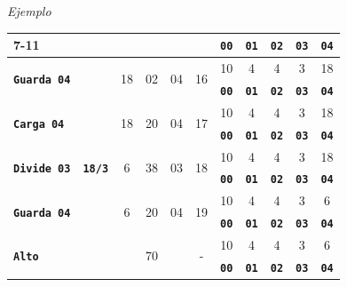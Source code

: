 \documentclass[11pt,spanish]{article}
\providecommand{\tabularnewline}{\\}
\begin{document}
\begin{bclogo}[noborder=true, couleurBarre=celestialblue,arrondi =0.1, couleur =anti-flashwhite, logo=\bccrayon, marge =10]{\textit{Ejemplo}}
\begin{center}
\begin{longtable}[c]{|l|c|c|c|c|c|c|c|c|c|c|}
\cline{7-11} \cline{8-11} \cline{9-11} \cline{10-11} \cline{11-11} 
 &  &  &  &  &  & \texttt{\textbf{00}} & \texttt{\textbf{01}} & \texttt{\textbf{02}} & \texttt{\textbf{03}} & \texttt{\textbf{04}}\tabularnewline
\hline 
\multirow{2}{*}{\texttt{\textbf{Guarda 04}}} & \multirow{2}{*}{} & \multirow{2}{*}{18} & \multirow{2}{*}{02} & \multirow{2}{*}{04} & \multirow{2}{*}{16} & 10 & 4 & 4 & 3 & 18\tabularnewline
\cline{7-11} \cline{8-11} \cline{9-11} \cline{10-11} \cline{11-11} 
 &  &  &  &  &  & \texttt{\textbf{00}} & \texttt{\textbf{01}} & \texttt{\textbf{02}} & \texttt{\textbf{03}} & \texttt{\textbf{04}}\tabularnewline
\hline 
\multirow{2}{*}{\texttt{\textbf{Carga 04}}} & \multirow{2}{*}{} & \multirow{2}{*}{18} & \multirow{2}{*}{20} & \multirow{2}{*}{04} & \multirow{2}{*}{17} & 10 & 4 & 4 & 3 & 18\tabularnewline
\cline{7-11} \cline{8-11} \cline{9-11} \cline{10-11} \cline{11-11} 
 &  &  &  &  &  & \texttt{\textbf{00}} & \texttt{\textbf{01}} & \texttt{\textbf{02}} & \texttt{\textbf{03}} & \texttt{\textbf{04}}\tabularnewline
\hline 
\multirow{2}{*}{\texttt{\textbf{Divide 03}}} & \multirow{2}{*}{\texttt{\textbf{18/3}}} & \multirow{2}{*}{6} & \multirow{2}{*}{38} & \multirow{2}{*}{03} & \multirow{2}{*}{18} & 10 & 4 & 4 & 3 & 18\tabularnewline
\cline{7-11} \cline{8-11} \cline{9-11} \cline{10-11} \cline{11-11} 
 &  &  &  &  &  & \texttt{\textbf{00}} & \texttt{\textbf{01}} & \texttt{\textbf{02}} & \texttt{\textbf{03}} & \texttt{\textbf{04}}\tabularnewline
\hline 
\multirow{2}{*}{\texttt{\textbf{Guarda 04}}} & \multirow{2}{*}{} & \multirow{2}{*}{6} & \multirow{2}{*}{20} & \multirow{2}{*}{04} & \multirow{2}{*}{19} & 10 & 4 & 4 & 3 & 6\tabularnewline
\cline{7-11} \cline{8-11} \cline{9-11} \cline{10-11} \cline{11-11} 
 &  &  &  &  &  & \texttt{\textbf{00}} & \texttt{\textbf{01}} & \texttt{\textbf{02}} & \texttt{\textbf{03}} & \texttt{\textbf{04}}\tabularnewline
\hline 
\multirow{2}{*}{\texttt{\textbf{Alto}}} & \multirow{2}{*}{} & \multirow{2}{*}{} & \multirow{2}{*}{70} & \multirow{2}{*}{} & \multirow{2}{*}{-} & 10 & 4 & 4 & 3 & 6\tabularnewline
\cline{7-11} \cline{8-11} \cline{9-11} \cline{10-11} \cline{11-11} 
 &  &  &  &  &  & \texttt{\textbf{00}} & \texttt{\textbf{01}} & \texttt{\textbf{02}} & \texttt{\textbf{03}} & \texttt{\textbf{04}}\tabularnewline
\hline 
\end{longtable}
\par\end{center}

\vspace{0.25cm}       
\end{bclogo}
\end{document}
